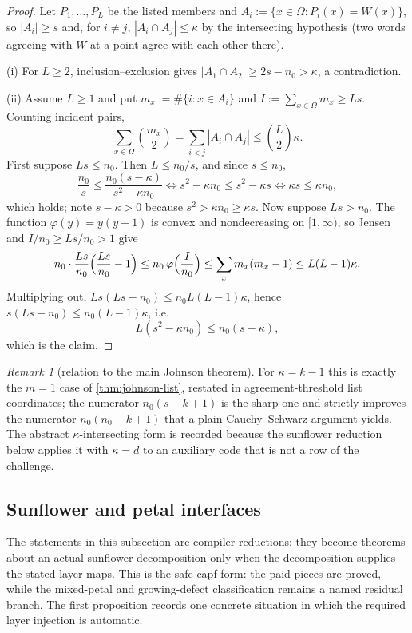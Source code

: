\documentclass[11pt]{article}
\theoremstyle{definition}
\theoremstyle{remark}
\newtheorem{remark}[remark]{Remark}
\begin{document}
\begin{proof}
Let $P_1,\ldots,P_L$ be the listed members and $A_i:=\{x\in\Omega:P_i(x)=W(x)\}$, so $|A_i|\ge s$ and, for $i\ne j$, $|A_i\cap A_j|\le\kappa$ by the intersecting hypothesis \textup{(two words agreeing with $W$ at a point agree with each other there)}.

\textup{(i)}  For $L\ge2$, inclusion--exclusion gives $|A_1\cap A_2|\ge2s-n_0>\kappa$, a contradiction.

\textup{(ii)}  Assume $L\ge1$ and put $m_x:=\#\{i:x\in A_i\}$ and $I:=\sum_{x\in\Omega}m_x\ge Ls$.  Counting incident pairs,
\[
        \sum_{x\in\Omega}\binom{m_x}2=\sum_{i<j}|A_i\cap A_j|\le\binom L2\kappa .
\]
First suppose $Ls\le n_0$.  Then $L\le n_0/s$, and since $s\le n_0$,
\[
        \frac{n_0}s\le\frac{n_0(s-\kappa)}{s^2-\kappa n_0}
        \iff
        s^2-\kappa n_0\le s^2-\kappa s
        \iff
        \kappa s\le\kappa n_0,
\]
which holds; note $s-\kappa>0$ because $s^2>\kappa n_0\ge\kappa s$.  Now suppose $Ls>n_0$.  The function $\varphi(y)=y(y-1)$ is convex and nondecreasing on $[1,\infty)$, so Jensen and $I/n_0\ge Ls/n_0>1$ give
\[
        n_0\cdot\frac{Ls}{n_0}\Bigl(\frac{Ls}{n_0}-1\Bigr)
        \le
        n_0\,\varphi\Bigl(\frac I{n_0}\Bigr)
        \le
        \sum_x m_x(m_x-1)
        \le
        L(L-1)\kappa .
\]
Multiplying out, $Ls(Ls-n_0)\le n_0L(L-1)\kappa$, hence $s(Ls-n_0)\le n_0(L-1)\kappa$, i.e.
\[
        L(s^2-\kappa n_0)\le n_0(s-\kappa),
\]
which is the claim.
\end{proof}

\begin{remark}[relation to the main Johnson theorem]\label{rem:capf-johnson-main}
For $\kappa=k-1$ this is exactly the $m=1$ case of \cref{thm:johnson-list}, restated in agreement-threshold list coordinates; the numerator $n_0(s-k+1)$ is the sharp one and strictly improves the numerator $n_0(n_0-k+1)$ that a plain Cauchy--Schwarz argument yields.  The abstract $\kappa$-intersecting form is recorded because the sunflower reduction below applies it with $\kappa=d$ to an auxiliary code that is not a row of the challenge.
\end{remark}

\subsection{Sunflower and petal interfaces}

The statements in this subsection are compiler reductions: they become theorems about an actual sunflower decomposition only when the decomposition supplies the stated layer maps.  This is the safe capf form: the paid pieces are proved, while the mixed-petal and growing-defect classification remains a named residual branch.  The first proposition records one concrete situation in which the required layer injection is automatic.
\end{document}
